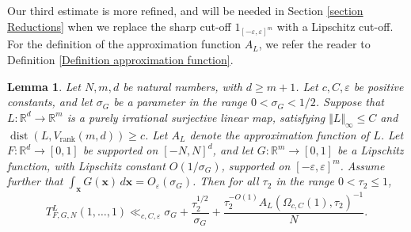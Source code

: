 \documentclass[12pt,a4paper,twoside,reqno]{amsart}
\newtheorem{Lemma}[Theorem]{Lemma}
\newcommand{\rank}{\operatorname{rank}}
\newcommand{\dist}{\operatorname{dist}}
\numberwithin{equation}{section}
\begin{document}
Our third estimate is more refined, and will be needed in Section \ref{section Reductions} when we replace the sharp cut-off $1_{[-\varepsilon,\varepsilon]^m}$ with a Lipschitz cut-off. For the definition of the approximation function $A_L$, we refer the reader to Definition \ref{Definition approximation function}. 

\begin{Lemma}
\label{Lemma upper bound involving integral}
Let $N,m,d$ be natural numbers, with $d\geqslant m+1$. Let $c,C,\varepsilon$ be positive constants, and let $\sigma_G$ be a parameter in the range $0<\sigma_G < 1/2$. Suppose that $L:\mathbb{R}^d \longrightarrow \mathbb{R}^m$ is a purely irrational surjective linear map, satisfying $\Vert L\Vert_\infty \leqslant C$ and $\dist(L,V_{\rank}(m,d)) \geqslant c$. Let $A_L$ denote the approximation function of $L$. Let $F:\mathbb{R}^d \longrightarrow [0,1]$ be supported on $[-N,N]^d$, and let $G:\mathbb{R}^m\longrightarrow [0,1]$ be a Lipschitz function, with Lipschitz constant $O(1/\sigma_G)$, supported on $[-\varepsilon,\varepsilon]^m$. Assume further that $\int_{\mathbf{x}} G(\mathbf{x}) \, d\mathbf{x} = O_\varepsilon(\sigma_G)$. Then for all $\tau_2$ in the range $0<\tau_2\leqslant 1$, 
\begin{equation*}
 T_{F,G,N}^L(1,\dots,1) \ll_{c,C,\varepsilon} \sigma_G + \frac{\tau_2^{1/2}}{\sigma _G} +  \frac{\tau_2^{-O(1)}A_L(\Omega_{c,C}(1),\tau_2)^{-1}}{N}.
 \end{equation*}
\end{Lemma}
\end{document}
